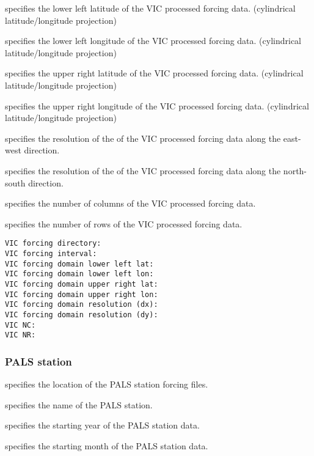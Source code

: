   specifies the lower left
 latitude of the VIC processed forcing data.
 (cylindrical latitude/longitude projection)

  specifies the lower left
 longitude of the VIC processed forcing data.
 (cylindrical latitude/longitude projection)

  specifies the upper
 right latitude of the VIC processed forcing data.
 (cylindrical latitude/longitude projection)

  specifies the upper
 right longitude of the VIC processed forcing data.
 (cylindrical latitude/longitude projection)

  specifies the resolution
 of the of the VIC processed forcing data along the east-west direction.

  specifies the resolution
 of the of the VIC processed forcing data along the north-south
 direction.

  specifies the number of columns of the VIC
 processed forcing data.

  specifies the number of rows of the VIC processed
 forcing data.
 

 \begin{Verbatim}[frame=single]
VIC forcing directory:
VIC forcing interval:
VIC forcing domain lower left lat:
VIC forcing domain lower left lon:
VIC forcing domain upper right lat:
VIC forcing domain upper right lon:
VIC forcing domain resolution (dx):
VIC forcing domain resolution (dy):
VIC NC:
VIC NR:
 \end{Verbatim}

 
 \subsubsection{PALS station} \label{sssec:pals}
 

 
  specifies the location of the
 PALS station forcing files.

  specifies the name of the
 PALS station.

  specifies the starting
 year of the PALS station data.

  specifies the starting
 month of the PALS station data.

